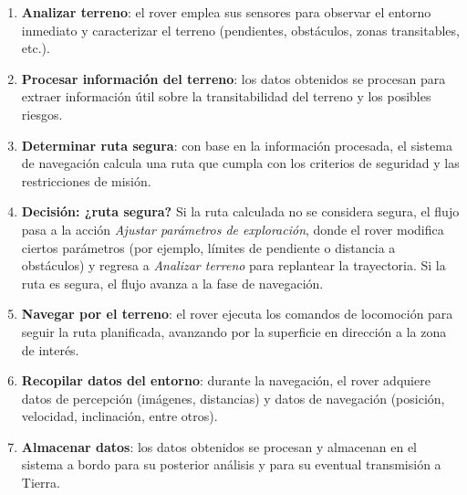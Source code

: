 \begin{enumerate}
  \item \textbf{Analizar terreno}: el rover emplea sus sensores para observar el entorno inmediato y
        caracterizar el terreno (pendientes, obstáculos, zonas transitables, etc.).

  \item \textbf{Procesar información del terreno}: los datos obtenidos se procesan para extraer
        información útil sobre la transitabilidad del terreno y los posibles riesgos.

  \item \textbf{Determinar ruta segura}: con base en la información procesada, el sistema de
        navegación calcula una ruta que cumpla con los criterios de seguridad y las restricciones
        de misión.

  \item \textbf{Decisión: ¿ruta segura?} Si la ruta calculada no se considera segura, el flujo
        pasa a la acción \textit{Ajustar parámetros de exploración}, donde el rover modifica ciertos
        parámetros (por ejemplo, límites de pendiente o distancia a obstáculos) y regresa a
        \textit{Analizar terreno} para replantear la trayectoria. Si la ruta es segura, el flujo
        avanza a la fase de navegación.

  \item \textbf{Navegar por el terreno}: el rover ejecuta los comandos de locomoción para seguir
        la ruta planificada, avanzando por la superficie en dirección a la zona de interés.

  \item \textbf{Recopilar datos del entorno}: durante la navegación, el rover adquiere datos
        de percepción (imágenes, distancias) y datos de navegación (posición,
        velocidad, inclinación, entre otros).

  \item \textbf{Almacenar datos}: los datos obtenidos se procesan y almacenan en el sistema a bordo
        para su posterior análisis y para su eventual transmisión a Tierra.


\end{enumerate}
